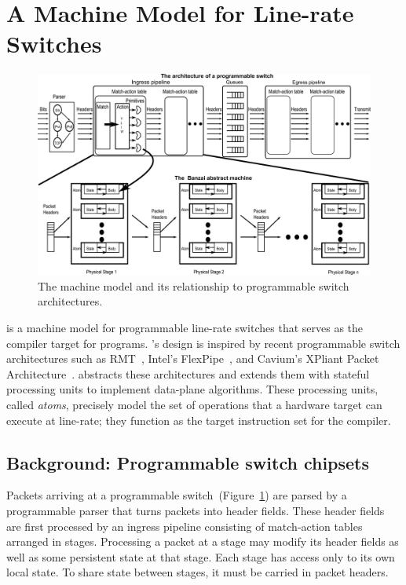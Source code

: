 \section{A Machine Model for Line-rate Switches}
\label{s:absmachine}

\begin{figure}[!t]
  \includegraphics[width=\textwidth]{banzai.pdf}
  \caption{The \absmachine machine model and its relationship to
  programmable switch architectures.}
  \label{fig:switch}
\end{figure}

\absmachine is a machine model for programmable line-rate switches
that serves as the compiler target for \pktlanguage programs.
\absmachine's design is inspired by recent programmable switch
architectures such as RMT~\cite{rmt}, Intel's
FlexPipe~\cite{flexpipe}, and Cavium's XPliant Packet
Architecture~\cite{xpliant}. \absmachine abstracts these architectures
and extends them with stateful processing units to implement
data-plane algorithms. These processing units, called {\em atoms},
precisely model the set of operations that a hardware target can
execute at line-rate; they function as the target instruction set for
the \pktlanguage compiler.

\subsection{Background: Programmable switch chipsets}
Packets arriving at a programmable switch~(Figure~\ref{fig:switch})
are parsed by a programmable parser that turns packets into header
fields. These header fields are first processed by an ingress pipeline
consisting of match-action tables arranged in stages. Processing a
packet at a stage may modify its header fields as well as some
persistent state at that stage. Each stage has access only to its own
local state. To share state between stages, it must be carried in
packet headers.

